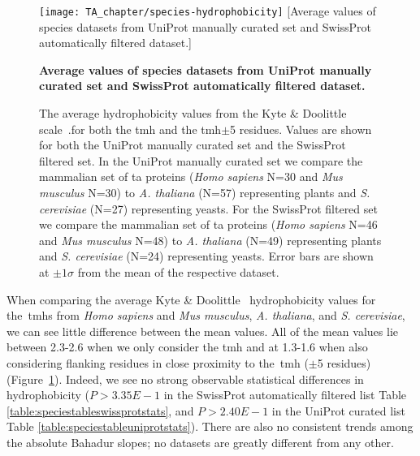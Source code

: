 \begin{figure}[!ht]
\centering
\texttt{[image: TA\_chapter/species-hydrophobicity]}
[Average values of species datasets from UniProt manually curated set and SwissProt automatically filtered dataset.]
{\textbf{Average values of species datasets from UniProt manually curated set and SwissProt automatically filtered dataset.}

The average hydrophobicity values from the Kyte \& Doolittle scale~\cite{Kyte1982}.for both the \gls{tmh} and the \gls{tmh}$\pm$5 residues.
Values are shown for both the UniProt manually curated set and the SwissProt filtered set. In the UniProt manually curated set we compare the mammalian set of \gls{ta} proteins (\textit{Homo sapiens} N=30 and \textit{Mus musculus} N=30) to \textit{A. thaliana} (N=57) representing plants and \textit{S. cerevisiae} (N=27) representing yeasts. For the SwissProt filtered set we compare the mammalian set of \gls{ta} proteins (\textit{Homo sapiens} N=46 and \textit{Mus musculus} N=48) to \textit{A. thaliana} (N=49) representing plants  and  \textit{S. cerevisiae} (N=24) representing yeasts.
Error bars are shown at $\pm 1 \sigma$ from the mean of the respective dataset.
}

\label{fig:average_species_hydrophobicity_ta}
\end{figure}

When comparing the average Kyte \& Doolittle~\cite{Kyte1982} hydrophobicity values for the~\gls{tmh}s from \textit{Homo sapiens} and \textit{Mus musculus}, \textit{A. thaliana}, and  \textit{S. cerevisiae}, we can see little difference between the mean values.
All of the mean values lie between 2.3-2.6 when we only consider the \gls{tmh} and at 1.3-1.6 when also considering flanking residues in close proximity to the~\gls{tmh} ($\pm$5 residues) (Figure~\ref{fig:average_species_hydrophobicity_ta}).
Indeed, we see no strong observable statistical differences in hydrophobicity ($P>3.35E-1$ in the SwissProt automatically filtered list Table \ref{table:speciestableswissprotstats}, and $P>2.40E-1$ in the UniProt curated list Table \ref{table:speciestableuniprotstats}).
There are also no consistent trends among the absolute Bahadur slopes; no datasets are greatly different from any other.

